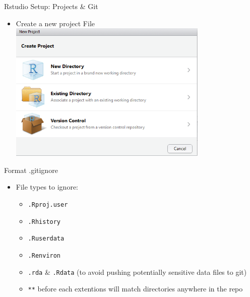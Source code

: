 \documentclass[ignorenonframetext,]{beamer}
\providecommand{\tightlist}{%
  \setlength{\itemsep}{0pt}\setlength{\parskip}{0pt}}
\begin{document}
\begin{frame}{Rstudio Setup: Projects \& Git}
\protect\hypertarget{rstudio-setup-projects-git-1}{}

\begin{itemize}
\tightlist
\item
  Create a new project File
  \includegraphics[width=0.75\textwidth,height=\textheight]{../external/images/setup_2_rstudio_project.PNG}
\end{itemize}

\end{frame}

\begin{frame}[fragile]{Format .gitignore}
\protect\hypertarget{format-.gitignore}{}

\begin{itemize}
\tightlist
\item
  File types to ignore:

  \begin{itemize}
  \tightlist
  \item
    \texttt{.Rproj.user}
  \item
    \texttt{.Rhistory}
  \item
    \texttt{.Ruserdata}
  \item
    \texttt{.Renviron}
  \item
    \texttt{.rda} \& \texttt{.Rdata} (to avoid pushing potentially
    sensitive data files to git)
  \item
    \texttt{**} before each extentions will match directories anywhere
    in the repo
  \end{itemize}
\end{itemize}

\end{frame}
\end{document}
